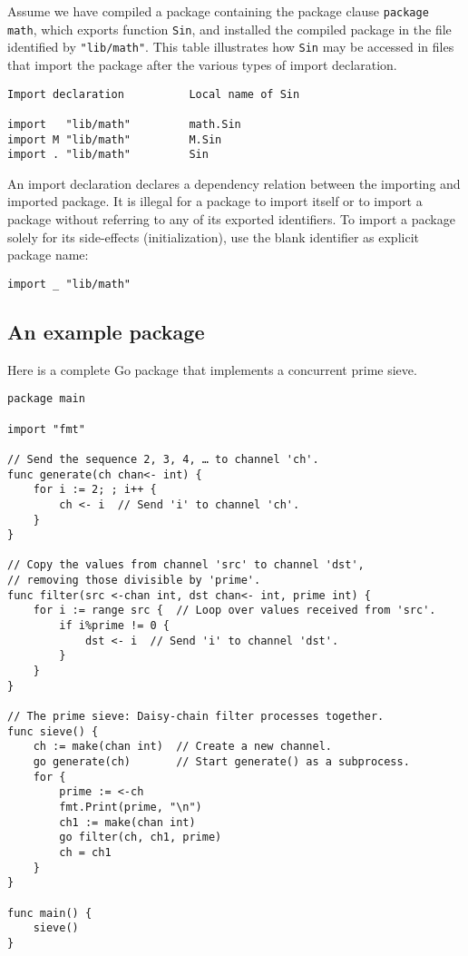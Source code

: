Assume we have compiled a package containing the package clause
\texttt{package math}, which exports function \texttt{Sin}, and
installed the compiled package in the file identified by
\texttt{"lib/math"}. This table illustrates how \texttt{Sin} may be
accessed in files that import the package after the various types of
import declaration.

\begin{Verbatim}[frame=single]
Import declaration          Local name of Sin

import   "lib/math"         math.Sin
import M "lib/math"         M.Sin
import . "lib/math"         Sin
\end{Verbatim}

An import declaration declares a dependency relation between the
importing and imported package. It is illegal for a package to import
itself or to import a package without referring to any of its exported
identifiers. To import a package solely for its side-effects
(initialization), use the blank identifier
as explicit package name:

\begin{Verbatim}[frame=single]
import _ "lib/math"
\end{Verbatim}

\subsection*{An example package}

Here is a complete Go package that implements a concurrent prime sieve.

\begin{Verbatim}[frame=single]
package main

import "fmt"

// Send the sequence 2, 3, 4, … to channel 'ch'.
func generate(ch chan<- int) {
    for i := 2; ; i++ {
        ch <- i  // Send 'i' to channel 'ch'.
    }
}

// Copy the values from channel 'src' to channel 'dst',
// removing those divisible by 'prime'.
func filter(src <-chan int, dst chan<- int, prime int) {
    for i := range src {  // Loop over values received from 'src'.
        if i%prime != 0 {
            dst <- i  // Send 'i' to channel 'dst'.
        }
    }
}

// The prime sieve: Daisy-chain filter processes together.
func sieve() {
    ch := make(chan int)  // Create a new channel.
    go generate(ch)       // Start generate() as a subprocess.
    for {
        prime := <-ch
        fmt.Print(prime, "\n")
        ch1 := make(chan int)
        go filter(ch, ch1, prime)
        ch = ch1
    }
}

func main() {
    sieve()
}
\end{Verbatim}


